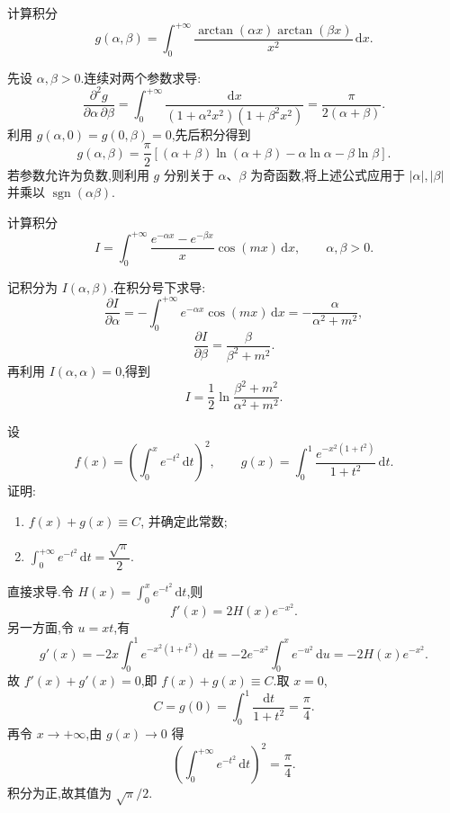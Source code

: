 \begin{example}
    计算积分
    \[
        g(\alpha,\beta)=\int_0^{+\infty}\dfrac{\arctan(\alpha x)\arctan(\beta x)}{x^2}\,\mathrm{d}x.
    \]
\end{example}
\exampleblank

\begin{solution}
    先设 $\alpha,\beta>0$.连续对两个参数求导:
    \[
        \dfrac{\partial^2g}{\partial\alpha\,\partial\beta}
        =\int_0^{+\infty}\dfrac{\mathrm{d}x}{(1+\alpha^2x^2)(1+\beta^2x^2)}
        =\dfrac{\pi}{2(\alpha+\beta)}.
    \]
    利用 $g(\alpha,0)=g(0,\beta)=0$,先后积分得到
    \[
        g(\alpha,\beta)=\dfrac{\pi}{2}\left[(\alpha+\beta)\ln(\alpha+\beta)
            -\alpha\ln\alpha-\beta\ln\beta\right].
    \]
    若参数允许为负数,则利用 $g$ 分别关于 $\alpha$、$\beta$ 为奇函数,将上述公式应用于
    $|\alpha|,|\beta|$ 并乘以 $\operatorname{sgn}(\alpha\beta)$.
\end{solution}

\begin{example}
    计算积分
    \[
        I=\int_0^{+\infty}\dfrac{e^{-\alpha x}-e^{-\beta x}}{x}\cos(mx)\,\mathrm{d}x,
        \qquad \alpha,\beta>0.
    \]
\end{example}
\exampleblank

\begin{solution}
    记积分为 $I(\alpha,\beta)$.在积分号下求导:
    \[
        \dfrac{\partial I}{\partial\alpha}
        =-\int_0^{+\infty}e^{-\alpha x}\cos(mx)\,\mathrm{d}x
        =-\dfrac{\alpha}{\alpha^2+m^2},
    \]
    \[
        \dfrac{\partial I}{\partial\beta}
        =\dfrac{\beta}{\beta^2+m^2}.
    \]
    再利用 $I(\alpha,\alpha)=0$,得到
    \[
        I=\dfrac{1}{2}\ln\dfrac{\beta^2+m^2}{\alpha^2+m^2}.
    \]
\end{solution}

\begin{example}
    设
    \[
        f(x)=\left(\int_0^x e^{-t^2}\,\mathrm{d}t\right)^2,
        \qquad
        g(x)=\int_0^1\dfrac{e^{-x^2(1+t^2)}}{1+t^2}\,\mathrm{d}t.
    \]
    证明:
    \begin{enumerate}
        \item $f(x)+g(x)\equiv C$, 并确定此常数;
        \item $\displaystyle\int_0^{+\infty}e^{-t^2}\,\mathrm{d}t=\dfrac{\sqrt{\pi}}{2}$.
    \end{enumerate}
\end{example}
\exampleblank

\begin{solution}
    直接求导.令 $H(x)=\displaystyle\int_0^xe^{-t^2}\,\mathrm{d}t$,则
    \[
        f'(x)=2H(x)e^{-x^2}.
    \]
    另一方面,令 $u=xt$,有
    \[
        g'(x)=-2x\int_0^1e^{-x^2(1+t^2)}\,\mathrm{d}t
        =-2e^{-x^2}\int_0^xe^{-u^2}\,\mathrm{d}u=-2H(x)e^{-x^2}.
    \]
    故 $f'(x)+g'(x)=0$,即 $f(x)+g(x)\equiv C$.取 $x=0$,
    \[
        C=g(0)=\int_0^1\dfrac{\mathrm{d}t}{1+t^2}=\dfrac{\pi}{4}.
    \]
    再令 $x\to+\infty$,由 $g(x)\to0$ 得
    \[
        \left(\int_0^{+\infty}e^{-t^2}\,\mathrm{d}t\right)^2=\dfrac{\pi}{4}.
    \]
    积分为正,故其值为 $\sqrt\pi/2$.
\end{solution}


